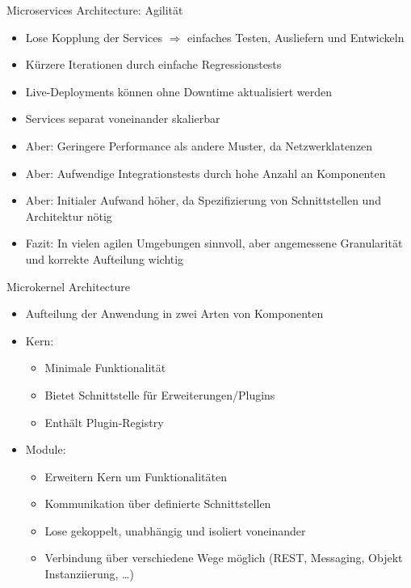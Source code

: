 \begin{frame}{Microservices Architecture: Agilität}
    \begin{itemize}
        \item Lose Kopplung der Services $\Rightarrow$ einfaches Testen, Ausliefern und Entwickeln
        \item Kürzere Iterationen durch einfache Regressionstests
        \item Live-Deployments können ohne Downtime aktualisiert werden
        \item Services separat voneinander skalierbar
        \item Aber: Geringere Performance als andere Muster, da Netzwerklatenzen
        \item Aber: Aufwendige Integrationstests durch hohe Anzahl an Komponenten
        \item Aber: Initialer Aufwand höher, da Spezifizierung von Schnittstellen und Architektur nötig~\cite{architecturePatterns}
        \item Fazit: In vielen agilen Umgebungen sinnvoll, aber angemessene Granularität und korrekte Aufteilung wichtig
    \end{itemize}
\end{frame}



\begin{frame}{Microkernel Architecture}
    \begin{itemize}
        \item Aufteilung der Anwendung in zwei Arten von Komponenten~\cite{architecturePatterns}
        \item Kern:
        \begin{itemize}
            \item Minimale Funktionalität
            \item Bietet Schnittstelle für Erweiterungen/Plugins
            \item Enthält Plugin-Registry
        \end{itemize}
        \item Module:
        \begin{itemize}
            \item Erweitern Kern um Funktionalitäten
            \item Kommunikation über definierte Schnittstellen
            \item Lose gekoppelt, unabhängig und isoliert voneinander
            \item Verbindung über verschiedene Wege möglich (REST, Messaging, Objekt Instanziierung, \ldots)
            \end{itemize}
    \end{itemize}
\end{frame}

